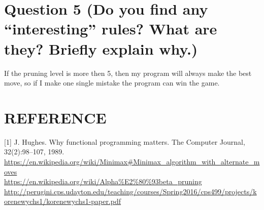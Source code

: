 \documentclass[titlepage]{article}
\begin{document}
\section{Question 5 (Do you find any “interesting” rules? What are they? Briefly explain why.)}
\label{sec:orgc165414}
If the pruning level is more then 5, then my program will always make the best move, so if I make one single mistake the program can win the game.

\section{REFERENCE}
\label{sec:orgda6c45d}
[1] J. Hughes. Why functional programming matters. The
Computer Journal, 32(2):98–107, 1989. \\
\url{https://en.wikipedia.org/wiki/Minimax\#Minimax\_algorithm\_with\_alternate\_moves} \\
\url{https://en.wikipedia.org/wiki/Alpha\%E2\%80\%93beta\_pruning}       \\
\url{http://perugini.cps.udayton.edu/teaching/courses/Spring2016/cps499/projects/korenewychs1/korenewychs1-paper.pdf}
\end{document}

